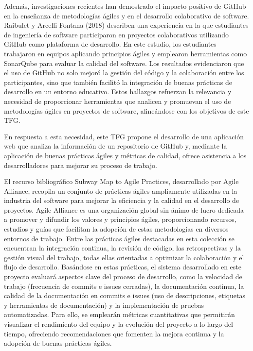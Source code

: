 Además, investigaciones recientes han demostrado el impacto positivo de GitHub en la enseñanza de metodologías ágiles y en el desarrollo colaborativo de software. Raibulet y Arcelli Fontana (2018) \cite{raibulet2018409} describen una experiencia en la que estudiantes de ingeniería de software participaron en proyectos colaborativos utilizando GitHub como plataforma de desarrollo. En este estudio, los estudiantes trabajaron en equipos aplicando principios ágiles y emplearon herramientas como SonarQube para evaluar la calidad del software. Los resultados evidenciaron que el uso de GitHub no solo mejoró la gestión del código y la colaboración entre los participantes, sino que también facilitó la integración de buenas prácticas de desarrollo en un entorno educativo. Estos hallazgos refuerzan la relevancia y necesidad de proporcionar herramientas que analicen y promuevan el uso de metodologías ágiles en proyectos de software, alineándose con los objetivos de este TFG.

En respuesta a esta necesidad, este TFG propone el desarrollo de una aplicación web que analiza la información de un repositorio de GitHub y, mediante la aplicación de buenas prácticas ágiles y métricas de calidad, ofrece asistencia a los desarrolladores para mejorar su proceso de trabajo.

El recurso bibliográfico Subway Map to Agile Practices, desarrollado por Agile Alliance, recopila un conjunto de prácticas ágiles ampliamente utilizadas en la industria del software para mejorar la eficiencia y la calidad en el desarrollo de proyectos. Agile Alliance es una organización global sin ánimo de lucro dedicada a promover y difundir los valores y principios ágiles, proporcionando recursos, estudios y guías que facilitan la adopción de estas metodologías en diversos entornos de trabajo. Entre las prácticas ágiles destacadas en esta colección se encuentran la integración continua, la revisión de código, las retrospectivas y la gestión visual del trabajo, todas ellas orientadas a optimizar la colaboración y el flujo de desarrollo. Basándose en estas prácticas, el sistema desarrollado en este proyecto evaluará aspectos clave del proceso de desarrollo, como la velocidad de trabajo (frecuencia de commits e issues cerradas), la documentación continua, la calidad de la documentación en commits e issues (uso de descripciones, etiquetas y herramientas de documentación) y la implementación de pruebas automatizadas. Para ello, se emplearán métricas cuantitativas que permitirán visualizar el rendimiento del equipo y la evolución del proyecto a lo largo del tiempo, ofreciendo recomendaciones que fomenten la mejora continua y la adopción de buenas prácticas ágiles.

